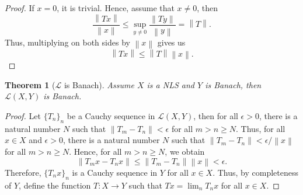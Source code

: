 \documentclass{article}
\newtheorem*{theorem}{Theorem}
\renewcommand{\L}{\mathcal{L}}
\newcommand{\norm}[1]{\left\lVert#1 \right\rVert}
\begin{document}
\begin{proof}
    If $x = 0$, it is trivial. Hence, assume that $x \neq 0$, then
    $$\frac{\norm{Tx}}{\norm{x}} \leq \sup_{y \neq 0}\frac{\norm{Ty}}{\norm{y}} = \norm{T}.$$
    Thus, multiplying on both sides by $\norm{x}$ gives us
    $$\norm{Tx} \leq \norm{T}\norm{x}.$$
\end{proof}

\begin{theorem}[$\L$ is Banach]
    Assume $X$ is a NLS and $Y$ is Banach, then $\L(X,Y)$ is Banach. 
\end{theorem}

\begin{proof}
    Let $\{T_n\}_n$ be a Cauchy sequence in $\L(X,Y)$, then for all $\epsilon > 0$, there is a natural number $N$ such that $\norm{T_m - T_n} < \epsilon$ for all $m > n \geq N$. Thus, for all $x \in X$ and $\epsilon > 0$, there is a natural number $N$ such that $\norm{T_m - T_n} < \epsilon/\norm{x}$ for all $m > n \geq N$. Hence, for all $m > n \geq N$, we obtain
    $$\norm{T_m x - T_n x} \leq \norm{T_m - T_n} \norm{x} < \epsilon.$$
    Therefore, $\{T_nx\}_n$ is a Cauchy sequence in $Y$ for all $x \in X$. Thus, by completeness of $Y$, define the function $T : X \to Y$ such that $Tx = \lim_n T_n x$ for all $x \in X$.
\end{proof}
\end{document}
